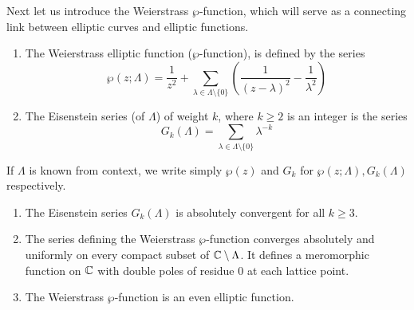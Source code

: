 Next let us introduce the Weierstrass $\wp$-function, which will serve
as a connecting link between elliptic curves and elliptic functions.

\begin{definition}
	\begin{enumerate}[label=(\alph*)]
		\item
			The Weierstrass
			elliptic function ($\wp$-function),
			is defined by the series
			\begin{equation*}
				\wp(z; \Lambda) = \frac{1}{z^2}
				+ \sum_{\lambda \in \Lambda\setminus\{0\}}
				\left(
					\frac{1}{(z-\lambda)^2} - \frac{1}{\lambda^2}
				\right)
			\end{equation*}
		\item
			The Eisenstein series (of $\Lambda$) of weight $k$,
			where $k \geq 2$ is an integer
			is the series
			\begin{equation*}
				G_k(\Lambda) = \sum_{\lambda \in \Lambda\setminus\{0\}}
				\lambda^{-k}
			\end{equation*}
	\end{enumerate}
\end{definition}

\begin{notation}
	If $\Lambda$ is known from context, we write simply
	$\wp(z)$ and $G_k$ for $\wp(z; \Lambda), G_k(\Lambda)$
	respectively.
\end{notation}

\begin{proposition}
	\label{prop:wp-properties}
	\begin{enumerate}[label=(\alph*)]
		\item	The Eisenstein series $G_k(\Lambda)$ is absolutely convergent
			for all $k \geq 3$.
		\item The series defining the Weierstrass $\wp$-function converges
			absolutely and uniformly on every compact subset of
			$\mathbb{C}\setminus\Lambda$. It defines a meromorphic function on $\mathbb{C}$ with 
			double poles of residue 0 at each lattice point.
		\item The Weierstrass $\wp$-function is an even elliptic function.
	\end{enumerate}
\end{proposition}

